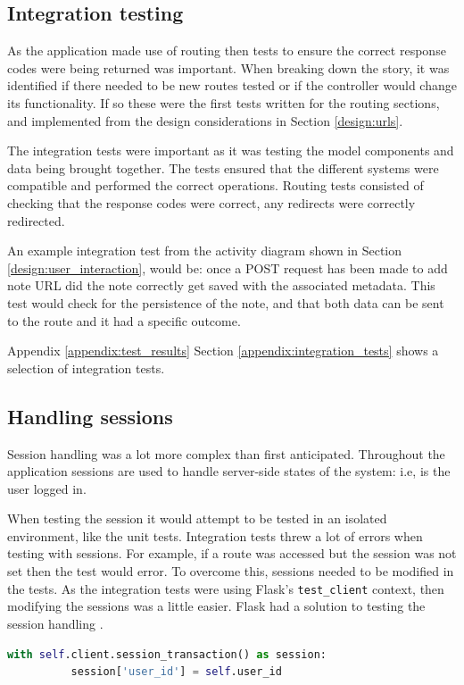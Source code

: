 \subsection{Integration testing}
As the application made use of routing then tests to ensure the correct response codes were being returned was important. When breaking down the story, it was identified if there needed to be new routes tested or if the controller would change its functionality. If so these were the first tests written for the routing sections, and implemented from the design considerations in Section \ref{design:urls}.

The integration tests were important as it was testing the model components and data being brought together. The tests ensured that the different systems were compatible and performed the correct operations. Routing tests consisted of checking that the response codes were correct, any redirects were correctly redirected.

An example integration test from the activity diagram shown in Section \ref{design:user_interaction}, would be: once a POST request has been made to add note URL did the note correctly get saved with the associated metadata. This test would check for the persistence of the note, and that both data can be sent to the route and it had a specific outcome.

Appendix \ref{appendix:test_results} Section \ref{appendix:integration_tests} shows a selection of integration tests.

\subsection{Handling sessions}
Session handling was a lot more complex than first anticipated. Throughout the application sessions are used to handle server-side states of the system: i.e, is the user logged in.

When testing the session it would attempt to be tested in an isolated environment, like the unit tests. Integration tests threw a lot of errors when testing with sessions. For example, if a route was accessed but the session was not set then the test would error. To overcome this, sessions needed to be modified in the tests. As the integration tests were using Flask's \texttt{test\_client} context, then modifying the sessions was a little easier. Flask had a solution to testing the session handling \cite{citeulike:14020609}.

\begin{lstlisting}[language=python, label={lst:session}, breaklines, columns=fullflexible, keywordstyle=\color{blue}, basicstyle=\normalsize\ttfamily, caption= {An example of how sessions were handled and modified in the tests.}]
  with self.client.session_transaction() as session:
          session['user_id'] = self.user_id
\end{lstlisting}

